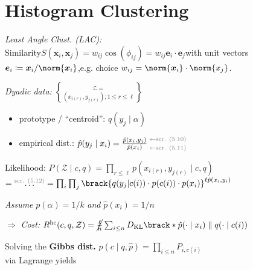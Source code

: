 \section{Histogram Clustering}

\emph{Least Angle Clust. (LAC): {\normalfont\sffamily[Idea]}}\\
Similarity\enspace $S(\bm x_i, \bm x_j) = w_{ij} \cos(\phi_{ij}) = w_{ij} \bm e_i \cdot \bm e_j$\enspace with unit vectors\enspace $\bm e_i \coloneqq \bm x_i / \norm{\bm x_i}$,\enspace e.g. choice $w_{ij} = \norm{\bm x_i} \cdot \norm{x_j}$.

\emph{Dyadic data:}\enspace
$\mathcal Z = \brace{ (x_{i(r)}, y_{j(r)}) ; 1\leq r\leq \ell }$

\begin{itemize}
    \item prototype / ``centroid'':\enspace
        $q(y_j \mid \alpha)$
    \item empirical dist.:\enspace
        $\hat p(y_j\mid x_i)
        = \frac{\hat p(x_i, y_j)}{\hat p(x_i)}
        \:\substack{
            \color{gray} \leftarrow \text{scr. (5.10)} \\[2pt]
            \color{gray} \leftarrow \text{scr. (5.11)}
        }$
    \iffalse
    $= \frac{
        \frac1\ell \sum_{r\leq\ell} \delta_{x_i, x_{i(r)}} \delta_{y_j, y_{j(r)}}
      }{
        \sum_{j\leq m} \hat p(x_i, y_j)
    }$
    \fi
\end{itemize}

Likelihood:\enspace
$P(\mathcal Z\mid c,q) = \prod_{r\leq\ell} p(x_{i(r)}, y_{j(r)} \mid c,q)$\\\quad
$= \overset{\text{\color{gray} scr. (5.12)}}{\ldots}
= \prod_i \prod_j \brack{ q(y_j\vert c(i)) \cdot p(c(i)) \cdot p(x_i)}^{\ell \hat p(x_i, y_i)}$

\textit{Assume} $p(\alpha)=1/k$ \textit{and} $\hat p(x_i) = 1/n$

$\Rightarrow$ \emph{Cost:}
$R\ap{hc} (c, q, \mathcal Z) = \cancel{\frac{\ell}{n}} \sum_{i\leq n} D\ped{KL} \brack*{\hat p(\cdot\mid x_i) \parallel q(\cdot\mid c(i))}$

Solving the \textbf{Gibbs dist.} $p(c \mid q, \hat p) = \prod_{i\leq n} P_{i, c(i)}$\\
via Lagrange yields 
{\color{gray}\scriptsize {}}


